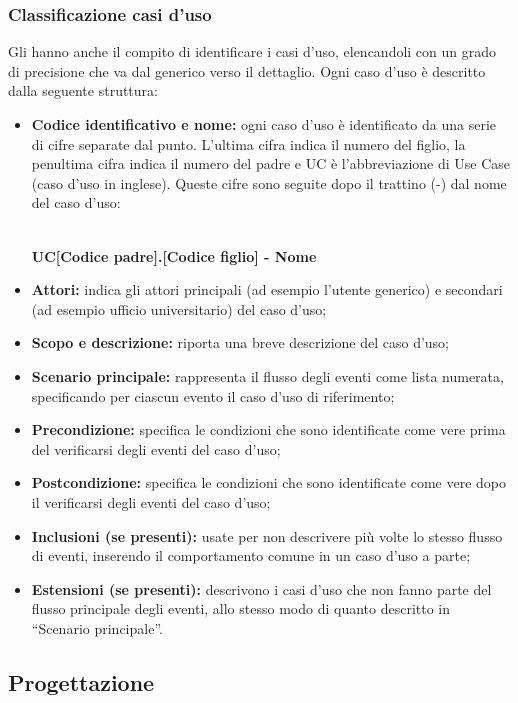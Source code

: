 \documentclass[NormeDiProgetto.tex]{subfiles}
\begin{document}
\subsubsection{Classificazione casi d'uso} Gli \alisti hanno anche il compito di identificare i casi d'uso, elencandoli con un grado di precisione che va dal generico verso il dettaglio. Ogni caso d'uso è descritto dalla seguente struttura:\\
\begin{itemize}
	\item \textbf{Codice identificativo e nome:} ogni caso d'uso è identificato da una serie di cifre separate dal punto. L'ultima cifra indica il numero del figlio, la penultima cifra indica il numero del padre e UC è l'abbreviazione di Use Case (caso d'uso in inglese). Queste cifre sono seguite dopo il trattino (-) dal nome del caso d'uso: \\\\
	\centerline{\textbf{UC[Codice padre].[Codice figlio] - Nome}}
	\item \textbf{Attori:} indica gli attori principali (ad esempio l'utente generico) e
	secondari (ad esempio ufficio universitario) del caso d'uso;
	\item \textbf{Scopo e descrizione:} riporta una breve descrizione del caso d'uso;
	\item \textbf{Scenario principale:} rappresenta il flusso degli eventi come lista
	numerata, specificando per ciascun evento il caso d'uso di riferimento;
	\item \textbf{Precondizione:} specifica le condizioni che sono identificate come vere
	prima del verificarsi degli eventi del caso d'uso;
	\item \textbf{Postcondizione:} specifica le condizioni che sono identificate come
	vere dopo il verificarsi degli eventi del caso d'uso;
	\item \textbf{Inclusioni (se presenti):} usate per non descrivere più volte lo stesso flusso di eventi,
	inserendo il comportamento comune in un caso d'uso a parte;
	\item \textbf{Estensioni (se presenti):} descrivono i casi d'uso che non fanno parte del flusso
	principale degli eventi, allo stesso modo di quanto descritto in “Scenario
	principale”.
\end{itemize}

\subsection{Progettazione}
\end{document}
